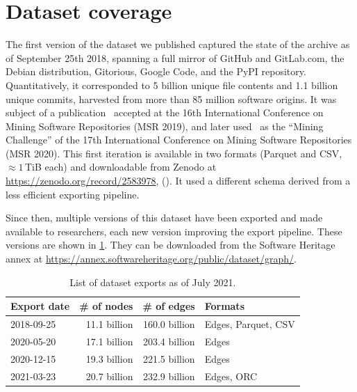 \section{Dataset coverage}%
\label{sec:swh-dataset-coverage}

The first version of the dataset we published captured the state of the \SWH{}
archive as of September 25th 2018, spanning a full mirror of GitHub and
GitLab.com, the Debian distribution, Gitorious, Google Code, and the PyPI
repository. Quantitatively, it corresponded to 5 billion unique file contents
and 1.1 billion unique commits, harvested from more than 85 million software
origins. It was subject of a publication~\cite{swh-msr2019-dataset} accepted at the
16th International Conference on Mining Software Repositories (MSR 2019), and
later used~\cite{msr-2020-challenge} as the ``Mining Challenge'' of the 17th
International Conference on Mining Software Repositories (MSR 2020).
This first iteration is available in two formats (Parquet and CSV,
$\approx 1$\,TiB each) and downloadable from Zenodo at
\url{https://zenodo.org/record/2583978}, (). It
used a different schema derived from a less efficient exporting pipeline.

Since then, multiple versions of this dataset have been exported and made
available to researchers, each new version improving the export pipeline. These
versions are shown in \cref{tab:swh-dataset-exports}. They can be
downloaded from the Software Heritage annex at
\url{https://annex.softwareheritage.org/public/dataset/graph/}.

\begin{table}
  \centering
    \caption{List of dataset exports as of July 2021.}%
    \label{tab:swh-dataset-exports}
    \begin{tabular}{l r r l}
        \hline\textbf{Export date} & \textbf{\# of nodes} & \textbf{\# of edges} & \textbf{Formats} \\ \hline

        2018-09-25 & 11.1 billion & 160.0 billion & Edges, Parquet, CSV \\ \hline
        2020-05-20 & 17.1 billion & 203.4 billion & Edges \\ \hline
        2020-12-15 & 19.3 billion & 221.5 billion & Edges \\ \hline
        2021-03-23 & 20.7 billion & 232.9 billion & Edges, ORC \\ \hline
    \end{tabular}
\end{table}

